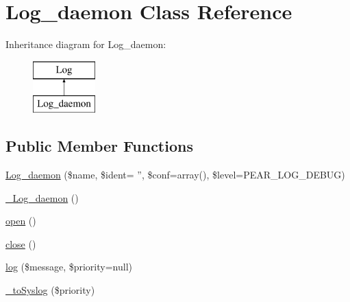 \hypertarget{class_log__daemon}{
\section{Log\_\-daemon Class Reference}
\label{class_log__daemon}
}
Inheritance diagram for Log\_\-daemon:\begin{figure}[H]
\begin{center}
\leavevmode
\includegraphics[height=2.000000cm]{class_log__daemon}
\end{center}
\end{figure}
\subsection*{Public Member Functions}
\begin{DoxyCompactItemize}
\item 
\hyperlink{class_log__daemon_aaa65d5c80b0b6d4779a6586e3fc81420}{Log\_\-daemon} (\$name, \$ident= '', \$conf=array(), \$level=PEAR\_\-LOG\_\-DEBUG)
\item 
\hyperlink{class_log__daemon_a33903cc9fd6af0bfeb673f5eb950a97f}{\_\-Log\_\-daemon} ()
\item 
\hyperlink{class_log__daemon_a44a2ac59a3b91f8c18905dce700934d6}{open} ()
\item 
\hyperlink{class_log__daemon_aa69c8bf1f1dcf4e72552efff1fe3e87e}{close} ()
\item 
\hyperlink{class_log__daemon_ac3758dfa38a67df158a446847cf06413}{log} (\$message, \$priority=null)
\item 
\hyperlink{class_log__daemon_a323d6a4c485bde666c56b68cbb015ffc}{\_\-toSyslog} (\$priority)
\end{DoxyCompactItemize}
